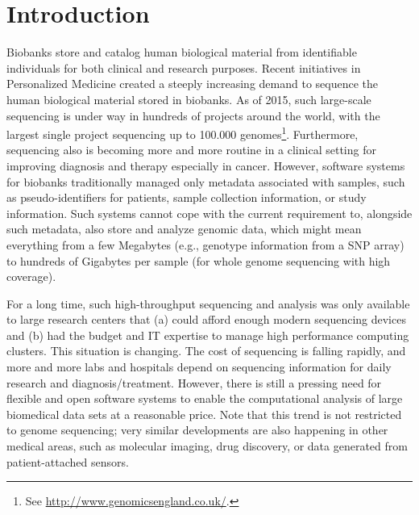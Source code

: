 
\section{Introduction}
Biobanks store and catalog human biological material from identifiable individuals for both clinical and research purposes. Recent initiatives in Personalized Medicine created a steeply increasing demand to sequence the human biological material stored in biobanks. As of 2015, such large-scale sequencing is under way in hundreds of projects around the world, with the largest single project sequencing up to 100.000 genomes\footnote{See \url{http://www.genomicsengland.co.uk/}.}. Furthermore, sequencing also is becoming more and more routine in a clinical setting for improving diagnosis and therapy especially in cancer\cite{pmedicine}. However, software systems for biobanks traditionally managed only metadata associated with samples, such as pseudo-identifiers for patients, sample collection information, or study information. Such systems cannot cope with the current requirement to, alongside such metadata, also store and analyze genomic data, which might mean everything from a few Megabytes (e.g., genotype information from a SNP array) to hundreds of Gigabytes per sample (for whole genome sequencing with high coverage). 

For a long time, such high-throughput sequencing and analysis was only available to large research centers that (a) could afford enough modern sequencing devices and (b) had the budget and IT expertise to manage high performance computing clusters. This situation is changing. The cost of sequencing is falling rapidly, and more and more labs and hospitals depend on sequencing information for daily research and diagnosis/treatment. However, there is still a pressing need for flexible and open software systems to enable the computational analysis of large biomedical data sets at a reasonable price. Note that this trend is not restricted to genome sequencing; very similar developments are also happening in other medical areas, such as molecular imaging\cite{imaging}, drug discovery\cite{drug}, or data generated from patient-attached sensors\cite{qself}. 

